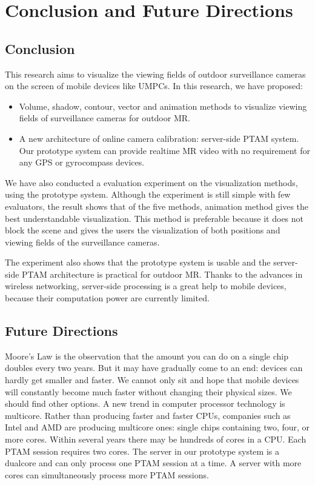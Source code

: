 \chapter{Conclusion and Future Directions}
\label{Chapter5}

\section{Conclusion}

This research aims to visualize the viewing fields of outdoor surveillance cameras on the screen of mobile devices like UMPCs. In this research, we have proposed:

\begin{itemize}
	\item Volume, shadow, contour, vector and animation methods to visualize viewing fields of surveillance cameras for outdoor MR.
	\item A new architecture of online camera calibration: server-side PTAM \cite{Reference12} system. Our prototype system can provide realtime MR video with no requirement for any GPS or gyrocompass devices.
\end{itemize}

We have also conducted a evaluation experiment on the visualization methods, using the prototype system. Although the experiment is still simple with few evaluators, the result shows that of the five methods, animation method gives the best understandable visualization. This method is preferable because it does not block the scene and gives the users the visualization of both positions and viewing fields of the surveillance cameras.

The experiment also shows that the prototype system is usable and the server-side PTAM architecture is practical for outdoor MR. Thanks to the advances in wireless networking, server-side processing is a great help to mobile devices, because their computation power are currently limited.

\section{Future Directions}

Moore's Law is the observation that the amount you can do on a single chip doubles every two years. But it may have gradually come to an end: devices can hardly get smaller and faster. We cannot only sit and hope that mobile devices will constantly become much faster without changing their physical sizes. We should find other options. A new trend in computer processor technology is multicore. Rather than producing faster and faster CPUs, companies such as Intel and AMD are producing multicore ones: single chips containing two, four, or more cores. Within several years there may be hundreds of cores in a CPU. Each PTAM session requires two cores. The server in our prototype system is a dualcore and can only process one PTAM session at a time. A server with more cores can simultaneously process more PTAM sessions.

